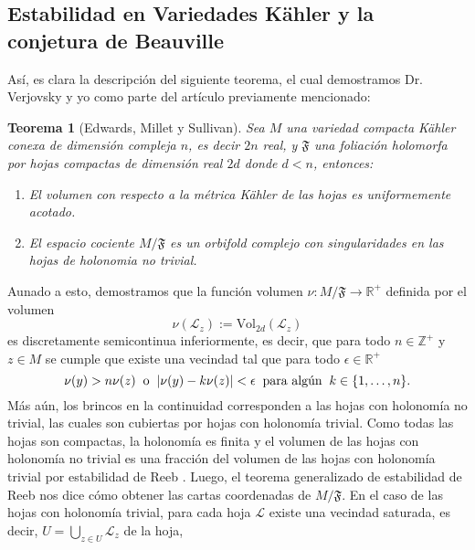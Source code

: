 \documentclass{article}
\newtheorem{teorema}{Teorema}[section]
\newcommand{\zah}{\ensuremath{ \mathbb Z }}
\newcommand{\re}{\ensuremath{\mathbb R }}
\begin{document}
\subsection{Estabilidad en Variedades K\"ahler y la conjetura de Beauville}

\noindent As\'i, es clara la descripci\'on del siguiente teorema, el cual demostramos Dr. Verjovsky y yo como parte del art\'iculo previamente mencionado:
\begin{teorema}[Edwards, Millet y Sullivan]\label{EMS}
        Sea $M$ una variedad compacta K\"ahler conexa de dimensi\'on compleja $n$, es decir $2n$ real, y $\mathfrak{F}$ una foliaci\'on holomorfa por hojas
        compactas de dimensi\'on real $2d$ donde $d<n$, entonces:
        \begin{enumerate}
                \item[a)] El volumen con respecto a la m\'etrica K\"ahler de las hojas es uniformemente acotado.
                \item[b)] El espacio cociente $M/\mathfrak{F}$ es un orbifold complejo con singularidades en las hojas de holonomia no trivial.
        \end{enumerate}
\end{teorema}
Aunado a esto, demostramos que la funci\'on volumen $\nu:M/\mathfrak{F}\rightarrow\re^{+}$ definida por el volumen 
\[
        \nu(\mathcal{L}_z):=\textrm{Vol}_{2d}(\mathcal{L}_z)
\] 
es discretamente semicontinua inferiormente, es decir, que para todo $n\in\zah^{+}$ y $z\in M$ se cumple que existe una vecindad
tal que para todo $\epsilon\in\re^{+}$ 
\[
        \nu(y)>n\nu(z)\hspace{0.2cm}\text{o}\hspace{0.2cm}|\nu(y)-k\nu(z)|<\epsilon\hspace{0.2cm}\text{para alg\'un}\hspace{0.2cm}k\in\{1,\dots,n\}.
\]
\noindent M\'as a\'un, los brincos en la continuidad corresponden a las hojas con holonom\'ia no trivial, las cuales son cubiertas
por hojas con holonom\'ia trivial. Como todas las hojas son compactas, la holonom\'ia es finita y el volumen de las hojas
con holonom\'ia no trivial es una fracci\'on del volumen de las hojas con holonom\'ia trivial por estabilidad de Reeb \cite{Thurston}. 
Luego, el teorema generalizado de estabilidad de Reeb \cite{Thurston} nos dice c\'omo obtener las cartas coordenadas de $M/\mathfrak{F}$. 
En el caso de las hojas con holonom\'ia trivial, para cada hoja $\mathcal{L}$ existe una vecindad saturada, es decir, $U=\bigcup_{z\in U}\mathcal{L}_z$ de la hoja, 
\end{document}
